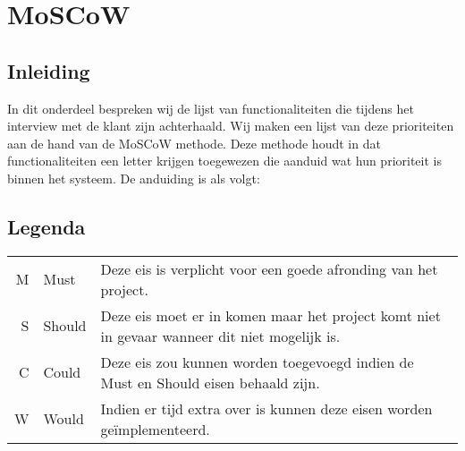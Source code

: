 \chapter{MoSCoW}

\section{Inleiding}
In dit onderdeel bespreken wij de lijst van functionaliteiten die tijdens het interview met de klant zijn achterhaald.
Wij maken een lijst van deze prioriteiten aan de hand van de MoSCoW methode. Deze methode houdt in dat functionaliteiten een letter krijgen toegewezen die aanduid wat hun prioriteit is binnen het systeem.
De anduiding is als volgt: 

\section{Legenda}
\begin{tabular}{ r l p{9cm} }
M & Must & Deze eis is verplicht voor een goede afronding van het project. \\
S & Should & Deze eis moet er in komen maar het project komt niet in gevaar wanneer dit niet mogelijk is. \\
C & Could & Deze eis zou kunnen worden toegevoegd indien de Must en Should eisen behaald zijn. \\
W & Would & Indien er tijd extra over is kunnen deze eisen worden geïmplementeerd. \\
\end{tabular}

